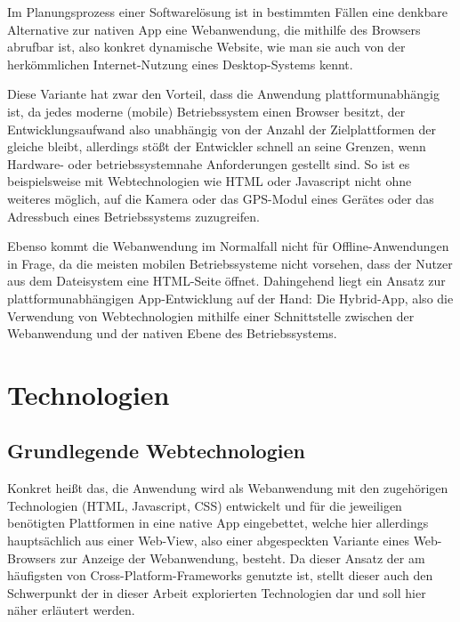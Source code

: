 \documentclass{scrreprt}
\begin{document}
Im Planungsprozess einer Softwarelösung ist in bestimmten Fällen eine denkbare Alternative zur nativen App eine Webanwendung, die mithilfe des Browsers abrufbar ist, also konkret dynamische Website, wie man sie auch von der herkömmlichen Internet-Nutzung eines Desktop-Systems kennt. 

Diese Variante hat zwar den Vorteil, dass die Anwendung plattformunabhängig ist, da jedes moderne (mobile) Betriebssystem einen Browser besitzt, der Entwicklungsaufwand also unabhängig von der Anzahl der Zielplattformen der gleiche bleibt, allerdings stößt der Entwickler schnell an seine Grenzen, wenn Hardware- oder betriebssystemnahe Anforderungen gestellt sind. So ist es beispielsweise mit Webtechnologien wie HTML oder Javascript nicht ohne weiteres möglich, auf die Kamera oder das GPS-Modul eines Gerätes oder das Adressbuch eines Betriebssystems zuzugreifen.

Ebenso kommt die Webanwendung im Normalfall nicht für Offline-Anwendungen in Frage, da die meisten mobilen Betriebssysteme nicht vorsehen, dass der Nutzer aus dem Dateisystem eine HTML-Seite öffnet.
Dahingehend liegt ein Ansatz zur plattformunabhängigen App-Entwicklung auf der Hand: Die Hybrid-App, also die Verwendung von Webtechnologien mithilfe einer Schnittstelle zwischen der Webanwendung und der nativen Ebene des Betriebssystems.

\section{Technologien}
\subsection{Grundlegende Webtechnologien}
Konkret heißt das, die Anwendung wird als Webanwendung mit den zugehörigen Technologien (HTML, Javascript, CSS) entwickelt und für die jeweiligen benötigten Plattformen in eine native App eingebettet, welche hier allerdings hauptsächlich aus einer Web-View, also einer abgespeckten Variante eines Web-Browsers zur Anzeige der Webanwendung, besteht. Da dieser Ansatz der am häufigsten von Cross-Platform-Frameworks genutzte ist,  stellt dieser auch den Schwerpunkt der in dieser Arbeit explorierten Technologien dar und soll hier näher erläutert werden. 
\end{document}

